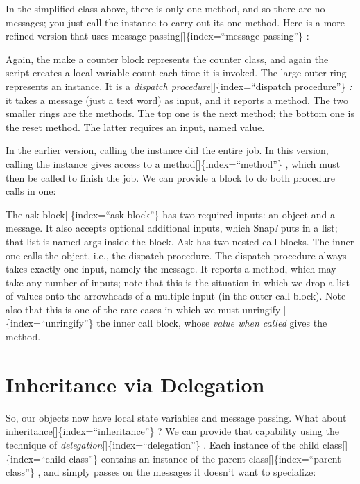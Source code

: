 \documentclass[
  letterpaper,
]{book}
\begin{document}
In the simplified class above, there is only one method, and so there
are no messages; you just call the instance to carry out its one method.
Here is a more refined version that uses message
passing{[}{]}\{index=``message passing''\} :

Again, the make a counter block represents the counter class, and again
the script creates a local variable count each time it is invoked. The
large outer ring represents an instance. It is a \emph{dispatch
procedure}{[}{]}\{index=``dispatch procedure''\} \emph{:} it takes a
message (just a text word) as input, and it reports a method. The two
smaller rings are the methods. The top one is the next method; the
bottom one is the reset method. The latter requires an input, named
value.

In the earlier version, calling the instance did the entire job. In this
version, calling the instance gives access to a
method{[}{]}\{index=``method''\} , which must then be called to finish
the job. We can provide a block to do both procedure calls in one:

The ask block{[}{]}\{index=``ask block''\} has two required inputs: an
object and a message. It also accepts optional additional inputs, which
Snap\emph{!} puts in a list; that list is named args inside the block.
Ask has two nested call blocks. The inner one calls the object, i.e.,
the dispatch procedure. The dispatch procedure always takes exactly one
input, namely the message. It reports a method, which may take any
number of inputs; note that this is the situation in which we drop a
list of values onto the arrowheads of a multiple input (in the outer
call block). Note also that this is one of the rare cases in which we
must unringify{[}{]}\{index=``unringify''\} the inner call block, whose
\emph{value when called} gives the method.

\section{Inheritance via Delegation}\label{inheritance-via-delegation}

So, our objects now have local state variables and message passing. What
about inheritance{[}{]}\{index=``inheritance''\} ? We can provide that
capability using the technique of
\emph{delegation}{[}{]}\{index=``delegation''\} . Each instance of the
child class{[}{]}\{index=``child class''\} contains an instance of the
parent class{[}{]}\{index=``parent class''\} , and simply passes on the
messages it doesn't want to specialize:
\end{document}
